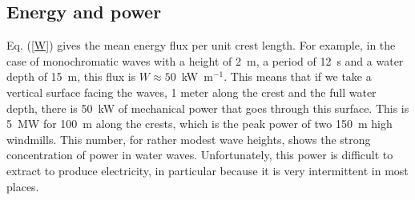 \subsection{Energy and power}
Eq. (\ref{W}) gives the mean energy flux per unit crest length. 
For example, in the case of monochromatic waves with a height of 2~m, a period of 12~s and
a water depth of 15~m, this flux is 
$W\approx 50$~kW~m$^{-1}$. This means that if we take a vertical surface facing the waves, 1 meter along the crest and the full water depth, there is 50~kW of mechanical power that goes through this surface. 
This is 5~MW for 100~m along the crests, which is the peak power of two  150~m high windmills. This number, for rather modest wave heights, 
shows the strong concentration of power in water waves. Unfortunately, this power is difficult to extract to produce electricity, in particular because it is very intermittent in most places.

